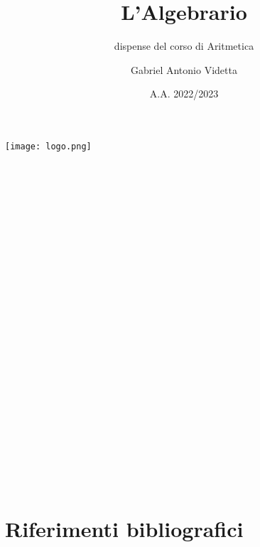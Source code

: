 \documentclass[11pt]{scrartcl}
\begin{document}
\title{L'Algebrario}
\subtitle{dispense del corso di Aritmetica}
\author{Gabriel Antonio Videtta}
\date{A.A. 2022/2023}
\maketitle
\thispagestyle{empty}

\begin{center}
	\texttt{[image: logo.png]}
\end{center}

\newpage
\thispagestyle{empty}
~\newpage



\newpage
\thispagestyle{empty}
~\newpage

\tableofcontents

\newpage
\thispagestyle{empty}
~\newpage



\newpage
\thispagestyle{empty}
~\newpage



\newpage
\thispagestyle{empty}
~\newpage



\newpage
\thispagestyle{empty}
~\newpage



\newpage
\thispagestyle{empty}
~\newpage



\newpage
\thispagestyle{empty}
~\newpage



\newpage
\thispagestyle{empty}
~\newpage



\newpage
\thispagestyle{empty}
~\newpage



\newpage
\thispagestyle{empty}
~\newpage



\newpage
\thispagestyle{empty}
~\newpage



\newpage
\thispagestyle{empty}
~\newpage



\newpage
\thispagestyle{empty}
~\newpage

\section{Riferimenti bibliografici}
\printbibliography[heading=none]
\end{document}
